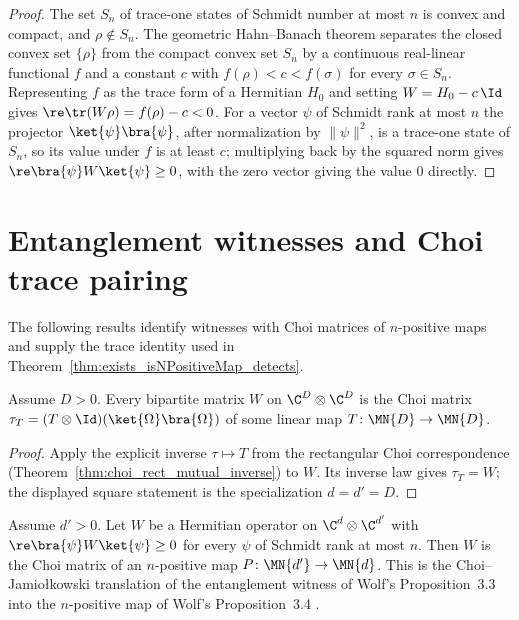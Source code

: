 \begin{proof}
    \leanok
    The set $S_n$ of trace-one states of Schmidt number at most $n$ is convex and
    compact, and $\rho\notin S_n$. The geometric Hahn--Banach theorem separates the
    closed convex set $\{\rho\}$ from the compact convex set $S_n$ by a continuous
    real-linear functional $f$ and a constant $c$ with $f(\rho)<c<f(\sigma)$ for every
    $\sigma\in S_n$. Representing $f$ as the trace form of a Hermitian $H_0$ and setting
    $W=H_0-c\,\Id$ gives $\re\tr(W\rho)=f(\rho)-c<0$. For a vector $\psi$
    of Schmidt rank at most $n$ the projector $\ket{\psi}\bra{\psi}$, after
    normalization by $\lVert\psi\rVert^2$, is a trace-one state of $S_n$, so its value
    under $f$ is at least $c$; multiplying back by the squared norm gives
    $\re\bra{\psi}W\ket{\psi}\ge 0$, with the zero vector giving the value
    $0$ directly.
\end{proof}

\section{Entanglement witnesses and Choi trace pairing}
\label{sec:app_positive_not_cp_witness_choi}

The following results identify witnesses with Choi matrices of $n$-positive
maps and supply the trace identity used in
Theorem~\ref{thm:exists_isNPositiveMap_detects}.

\begin{theorem}
    \label{thm:exists_choiMatrix_eq}
    \leanok
    Assume $D>0$. Every bipartite matrix $W$ on $\C^D\otimes\C^D$ is the Choi matrix
    $\tau_T=(T\otimes\Id)(\ket{\Omega}\bra{\Omega})$ of some linear map
    $T\colon\MN{D}\to\MN{D}$.
\end{theorem}

\begin{proof}
    \leanok
    Apply the explicit inverse $\tau\mapsto T$ from the rectangular Choi correspondence
    (Theorem~\ref{thm:choi_rect_mutual_inverse}) to $W$. Its inverse law gives
    $\tau_T=W$; the displayed square statement is the specialization $d=d'=D$.
\end{proof}

\begin{theorem}
    \label{thm:exists_isNPositiveMap_choiMatrix_eq}
    \leanok
    Assume $d'>0$. Let $W$ be a Hermitian operator on $\C^d\otimes\C^{d'}$ with
    $\re\bra{\psi}W\ket{\psi}\ge 0$ for every $\psi$ of Schmidt rank at most $n$.
    Then $W$ is the Choi matrix of an $n$-positive map
    $P\colon\MN{d'}\to\MN{d}$. This is the
    Choi--Jamio\l kowski translation of the entanglement witness of Wolf's Proposition~3.3
    into the $n$-positive map of Wolf's Proposition~3.4
    \cite[Chapter~3, Proposition~3.4]{Wolf2012Quantum}.
\end{theorem}

